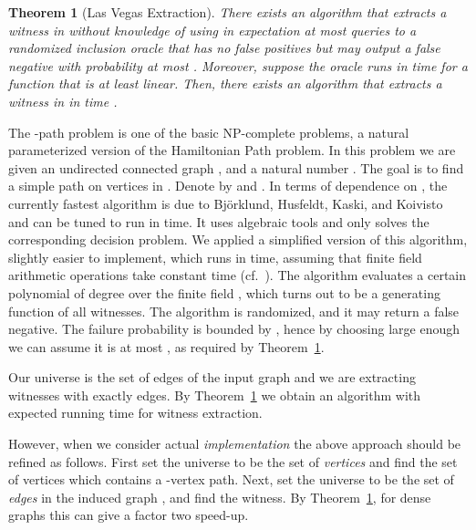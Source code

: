 \documentclass[11pt]{article}
\newtheorem{theorem}{Theorem}[]
\newcommand{\headingnsp}[1]{\noindent{\bf #1.\ }}\newcommand{\heading}[1]{\medskip\noindent{\bf #1.\ }}
\begin{document}
\begin{theorem}[Las Vegas Extraction]
\label{thm:main-randomized}
There exists an algorithm that extracts a witness in  
without knowledge of  using in expectation at most 
 queries to a randomized inclusion oracle that has no 
false positives but may output a false negative with probability at most 
. Moreover, suppose the oracle runs in time  
for a function  that is at least linear. Then, there exists an algorithm 
that extracts a witness in  in 
time . 
\end{theorem}

\headingnsp{An Application: -Path}
The -path problem is one of the basic NP-complete problems, a natural parameterized version of the Hamiltonian Path problem.
In this problem we are given an undirected connected graph , and a natural number . 
The goal is to find a simple path on  vertices in . 
Denote by  and .
In terms of dependence on , the currently fastest algorithm is due to Bj\"orklund, Husfeldt, Kaski, and Koivisto~\cite{BjorklundHusfeldtKaskiKoivisto2010} and can be tuned to run in  time.
It uses algebraic tools and only solves the corresponding decision problem.
We applied a simplified version of this algorithm, slightly easier to implement, which runs in  time, assuming that finite field arithmetic operations take constant time (cf.~\cite{fpt-textbook}). 
The algorithm evaluates a certain polynomial of degree  over the finite field , which turns out to be a generating function of all witnesses. The algorithm is randomized, and it may return a false negative. The failure probability is bounded by , hence by choosing  large enough we can assume it is at most , as required by Theorem~\ref{thm:main-randomized}.

Our universe  is the set of edges of the input graph and we are extracting witnesses with exactly  edges. 
By Theorem~\ref{thm:main-randomized} we obtain an algorithm with expected running time  for witness extraction.

However, when we consider actual {\em implementation} the above approach should be refined as follows.
First set the universe  to be the set of {\em vertices} and find the set of  vertices  which contains a -vertex path.
Next, set the universe  to be the set of {\em edges} in the induced graph , and find the witness. 
By Theorem~\ref{thm:main-randomized}, for dense graphs this can give a factor two speed-up.
\end{document}
